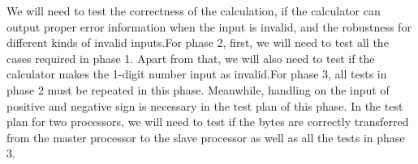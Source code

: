 We will need to test the correctness of the calculation, if the calculator can output proper error information when the input is invalid, and the robustness for different kinds of invalid inputs.For phase 2, first, we will need to test all the cases required in phase 1. Apart from that, we will also need to test if the calculator makes the 1-digit number input as invalid.For phase 3, all tests in phase 2 must be repeated in this phase. Meanwhile, handling on the input of positive and negative sign is necessary in the test plan of this phase. In the test plan for two processors, we will need to test if the bytes are correctly transferred from the master processor to the slave processor as well as all the tests in phase 3.